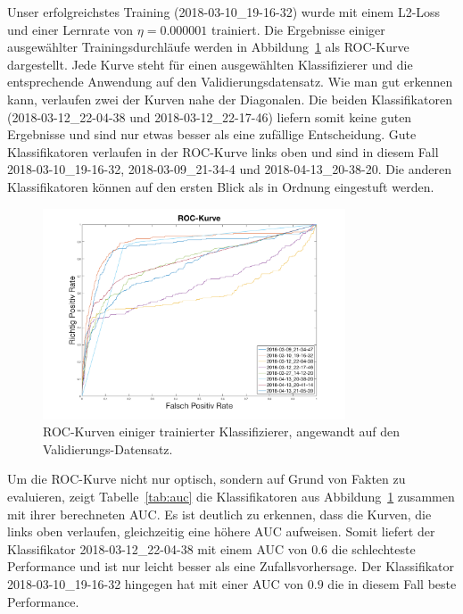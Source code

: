 Unser erfolgreichstes Training (2018-03-10\_19-16-32) wurde mit einem L2-Loss und einer Lernrate von $\eta= 0.000001$ trainiert. Die Ergebnisse einiger ausgewählter Trainingsdurchläufe werden in Abbildung~\ref{fig:roc} als ROC-Kurve dargestellt. Jede Kurve steht für einen ausgewählten Klassifizierer und die entsprechende Anwendung auf den Validierungsdatensatz. Wie man gut erkennen kann, verlaufen zwei der Kurven nahe der Diagonalen. Die beiden Klassifikatoren (2018-03-12\_22-04-38 und 2018-03-12\_22-17-46) liefern somit keine guten Ergebnisse und sind nur etwas besser als eine zufällige Entscheidung. Gute Klassifikatoren verlaufen in der ROC-Kurve links oben und sind in diesem Fall 2018-03-10\_19-16-32, 2018-03-09\_21-34-4 und 2018-04-13\_20-38-20. Die anderen Klassifikatoren können auf den ersten Blick als in Ordnung eingestuft werden.

\begin{figure}[htb!]
	\begin{center}
		\includegraphics[width=0.8\textwidth]{pics/evaluation/roc_analysis.png}
		\caption{ROC-Kurven einiger trainierter Klassifizierer, angewandt auf den Validierungs-Datensatz.}
		\label{fig:roc}
    \end{center}
\end{figure}

Um die ROC-Kurve nicht nur optisch, sondern auf Grund von Fakten zu evaluieren, zeigt Tabelle~\ref{tab:auc} die Klassifikatoren aus Abbildung~\ref{fig:roc} zusammen mit ihrer berechneten AUC. Es ist deutlich zu erkennen, dass die Kurven, die links oben verlaufen, gleichzeitig eine höhere AUC aufweisen. Somit liefert der Klassifikator 2018-03-12\_22-04-38 mit einem AUC von $0.6$ die schlechteste Performance und ist nur leicht besser als eine Zufallsvorhersage. Der Klassifikator 2018-03-10\_19-16-32 hingegen hat mit einer AUC von $0.9$ die in diesem Fall beste Performance. 

